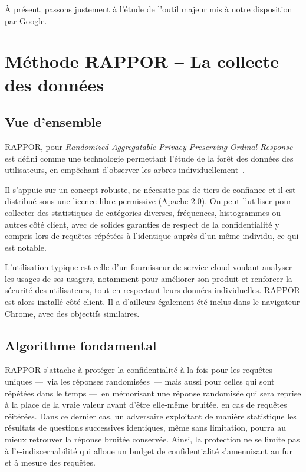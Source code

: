 \documentclass[a4paper,11pt]{article} %
\begin{document}
À présent, passons justement à l'étude de l'outil majeur mis à notre disposition par Google.

\section{Méthode RAPPOR -- La collecte des données}
\subsection{Vue d'ensemble}
RAPPOR, pour \emph{Randomized Aggregatable Privacy-Preserving Ordinal Response} est défini comme une technologie \og permettant l'étude de la forêt des données des utilisateurs, en empêchant d'observer les arbres individuellement\fg{}~\cite{EPK14}. 

Il s'appuie sur un concept robuste, ne nécessite pas de tiers de confiance et il est distribué sous une licence libre permissive (Apache 2.0). 
On peut l'utiliser pour collecter des statistiques de catégories diverses, fréquences, histogrammes ou autres côté client, avec de solides garanties de respect de la confidentialité y compris lors de requêtes répétées à l'identique auprès d'un même individu, ce qui est notable.

L'utilisation typique est celle d'un fournisseur de service \og cloud\fg{} voulant analyser les usages de ses usagers, notamment pour améliorer son produit et renforcer la sécurité des utilisateurs, tout en respectant leurs données individuelles. 
RAPPOR est alors installé côté client.
Il a d'ailleurs également été inclus dans le navigateur Chrome, avec des objectifs similaires.
%
\subsection{Algorithme fondamental}
%
RAPPOR s'attache à protéger la confidentialité à la fois pour les requêtes uniques ---~via les réponses randomisées~--- mais aussi pour celles qui sont répétées dans le temps ---~en mémorisant une réponse randomisée qui sera reprise à la place de la vraie valeur avant d'être elle-même bruitée, en cas de requêtes réitérées. 
Dans ce dernier cas, un adversaire exploitant de manière statistique les résultats de questions successives identiques, même sans limitation, pourra au mieux retrouver la réponse bruitée conservée.
Ainsi, la protection ne se limite pas à l'$\epsilon$-indiscernabilité qui alloue un budget de confidentialité s'amenuisant au fur et à mesure des requêtes. 
\end{document}
